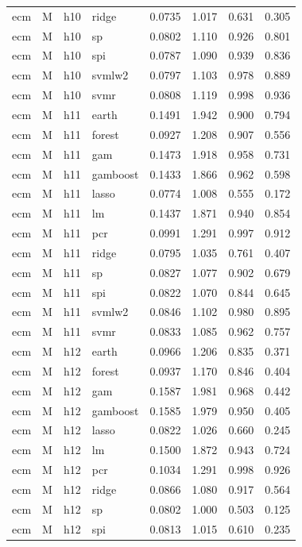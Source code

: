 \begin{ThreePartTable}
\begin{longtable}[t]{llclcccc}
ecm & M & h10 & ridge & 0.0735 & 1.017 & 0.631 & 0.305\\
ecm & M & h10 & sp & 0.0802 & 1.110 & 0.926 & 0.801\\
ecm & M & h10 & spi & 0.0787 & 1.090 & 0.939 & 0.836\\
ecm & M & h10 & svmlw2 & 0.0797 & 1.103 & 0.978 & 0.889\\
ecm & M & h10 & svmr & 0.0808 & 1.119 & 0.998 & 0.936\\
\addlinespace
ecm & M & h11 & earth & 0.1491 & 1.942 & 0.900 & 0.794\\
ecm & M & h11 & forest & 0.0927 & 1.208 & 0.907 & 0.556\\
ecm & M & h11 & gam & 0.1473 & 1.918 & 0.958 & 0.731\\
ecm & M & h11 & gamboost & 0.1433 & 1.866 & 0.962 & 0.598\\
ecm & M & h11 & lasso & 0.0774 & 1.008 & 0.555 & 0.172\\
ecm & M & h11 & lm & 0.1437 & 1.871 & 0.940 & 0.854\\
ecm & M & h11 & pcr & 0.0991 & 1.291 & 0.997 & 0.912\\
ecm & M & h11 & ridge & 0.0795 & 1.035 & 0.761 & 0.407\\
ecm & M & h11 & sp & 0.0827 & 1.077 & 0.902 & 0.679\\
ecm & M & h11 & spi & 0.0822 & 1.070 & 0.844 & 0.645\\
ecm & M & h11 & svmlw2 & 0.0846 & 1.102 & 0.980 & 0.895\\
ecm & M & h11 & svmr & 0.0833 & 1.085 & 0.962 & 0.757\\
\addlinespace
ecm & M & h12 & earth & 0.0966 & 1.206 & 0.835 & 0.371\\
ecm & M & h12 & forest & 0.0937 & 1.170 & 0.846 & 0.404\\
ecm & M & h12 & gam & 0.1587 & 1.981 & 0.968 & 0.442\\
ecm & M & h12 & gamboost & 0.1585 & 1.979 & 0.950 & 0.405\\
ecm & M & h12 & lasso & 0.0822 & 1.026 & 0.660 & 0.245\\
ecm & M & h12 & lm & 0.1500 & 1.872 & 0.943 & 0.724\\
ecm & M & h12 & pcr & 0.1034 & 1.291 & 0.998 & 0.926\\
ecm & M & h12 & ridge & 0.0866 & 1.080 & 0.917 & 0.564\\
ecm & M & h12 & sp & 0.0802 & 1.000 & 0.503 & 0.125\\
ecm & M & h12 & spi & 0.0813 & 1.015 & 0.610 & 0.235\\

\end{longtable}
\end{ThreePartTable}
